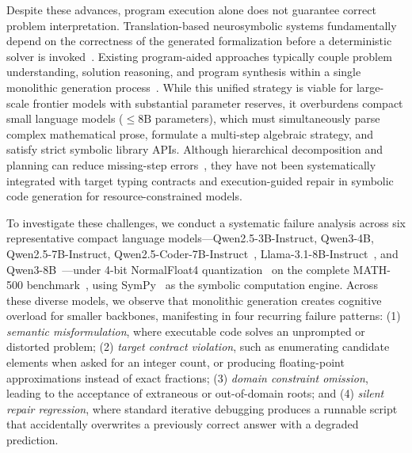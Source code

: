 \documentclass[conference,a4paper]{IEEEtran}
\begin{document}
Despite these advances, program execution alone does not guarantee correct problem interpretation. Translation-based neurosymbolic systems fundamentally depend on the correctness of the generated formalization before a deterministic solver is invoked~\cite{lyu2023faithful,pan2023logiclm}. Existing program-aided approaches typically couple problem understanding, solution reasoning, and program synthesis within a single monolithic generation process~\cite{gao2023pal,nezhad2025symcode}. While this unified strategy is viable for large-scale frontier models with substantial parameter reserves, it overburdens compact small language models ($\le 8\text{B}$ parameters), which must simultaneously parse complex mathematical prose, formulate a multi-step algebraic strategy, and satisfy strict symbolic library APIs. Although hierarchical decomposition and planning can reduce missing-step errors~\cite{khot2023decomposed,zhou2023leasttomost,wang2023plan}, they have not been systematically integrated with target typing contracts and execution-guided repair in symbolic code generation for resource-constrained models.

To investigate these challenges, we conduct a systematic failure analysis across six representative compact language models---Qwen2.5-3B-Instruct, Qwen3-4B, Qwen2.5-7B-Instruct, Qwen2.5-Coder-7B-Instruct~\cite{hui2024qwen25coder,qwen2024qwen25}, Llama-3.1-8B-Instruct~\cite{dubey2024llama3}, and Qwen3-8B~\cite{qwen2024qwen25}---under 4-bit NormalFloat4 quantization~\cite{dettmers2023qlora} on the complete MATH-500 benchmark~\cite{lightman2024verify,hendrycks2021math}, using SymPy~\cite{meurer2017sympy} as the symbolic computation engine. Across these diverse models, we observe that monolithic generation creates cognitive overload for smaller backbones, manifesting in four recurring failure patterns: (1) \textit{semantic misformulation}, where executable code solves an unprompted or distorted problem; (2) \textit{target contract violation}, such as enumerating candidate elements when asked for an integer count, or producing floating-point approximations instead of exact fractions; (3) \textit{domain constraint omission}, leading to the acceptance of extraneous or out-of-domain roots; and (4) \textit{silent repair regression}, where standard iterative debugging produces a runnable script that accidentally overwrites a previously correct answer with a degraded prediction.
\end{document}
